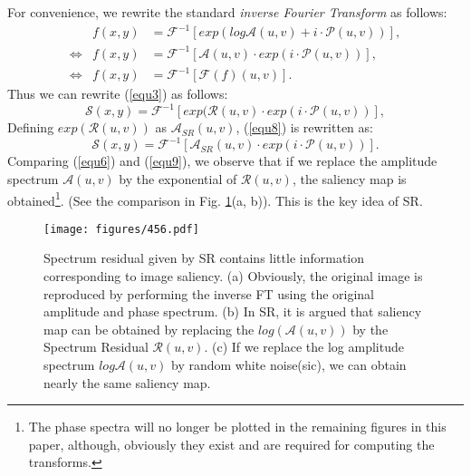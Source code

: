 \documentclass[10pt,journal,cspaper,compsoc]{IEEEtran}
\begin{document}
For convenience, we rewrite the standard {\it inverse Fourier Transform} as follows:
\begin{eqnarray}
&f(x,y)&={\mathcal F}^{-1}[exp(log {\mathcal A}(u,v)+i\cdot{\mathcal P}(u,v))],  \label {equ5} \\
\Leftrightarrow&f(x,y)&={\mathcal F}^{-1}[{\mathcal A}(u,v)\cdot exp(i\cdot{\mathcal P}(u,v))],   \label {equ6}\\
\Leftrightarrow&f(x,y)&={\mathcal F}^{-1}[{\mathcal F}(f)(u,v)].   \label {equ7}
\end{eqnarray}
Thus we can rewrite (\ref{equ3}) as follows:
\begin{equation}
{\mathcal S}(x,y)={\mathcal F}^{-1}[exp({\mathcal R}(u,v)\cdot exp(i\cdot{\mathcal P}(u,v))],  \label {equ8}
\end {equation}
Defining $exp({\mathcal R}(u,v))$ as ${\mathcal A}_{SR}(u,v)$, (\ref{equ8}) is rewritten as:
\begin{equation}
{\mathcal S}(x,y)={\mathcal F}^{-1}[{\mathcal A}_{SR}(u,v)\cdot exp(i\cdot{\mathcal P}(u,v))].  \label {equ9}
\end {equation}
Comparing (\ref{equ6}) and (\ref{equ9}), we observe that if we replace the amplitude spectrum ${\mathcal A}(u,v)$ by the exponential of ${\mathcal R}(u,v)$, the saliency map is obtained\footnote {The phase spectra will no longer be plotted in the remaining figures in this paper, although, obviously they exist and are required for computing the transforms.}. (See the comparison in Fig. \ref{fig:sr}(a, b)).  This is the key idea of SR.






\begin{figure}
\begin{center}
   \texttt{[image: figures/456.pdf]}
 \end{center}
  \caption{Spectrum residual given by SR contains little information corresponding to image saliency. (a) Obviously, the original image is reproduced by performing the inverse FT using the original amplitude and phase spectrum. (b) In SR, it is argued that saliency map can be obtained by replacing the $log({\mathcal A}(u,v))$ by the Spectrum Residual ${\mathcal R}(u,v)$. (c) If we replace the log amplitude spectrum $log{\mathcal A}(u,v)$ by random white noise(sic), we can obtain nearly the same saliency map.}
  \label{fig:sr}
\end{figure}
\end{document}
